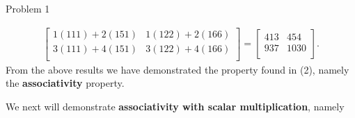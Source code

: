 \begin{problem}{Problem 1}
\begin{highlight}[Solution]
\begin{align*}
\begin{bmatrix}
                1(111) + 2(151) & 1(122) + 2(166) \\
                3(111) + 4(151) & 3(122) + 4(166) \\
            \end{bmatrix}
            = 
            \begin{bmatrix}
                413 & 454 \\
                937 & 1030 \\
            \end{bmatrix}.
        \end{align*}
        From the above results we have demonstrated the property found in (2), namely the \textbf{associativity} property.

        We next will demonstrate \textbf{associativity with scalar multiplication}, namely


\end{highlight}
\end{problem}
